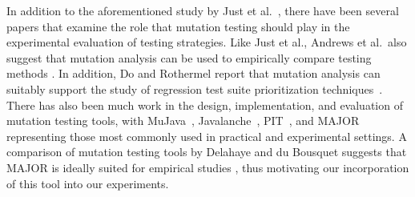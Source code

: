 In addition to the aforementioned study by Just et al.~\cite{just2014}, there have been several papers that examine the role that mutation testing should play in the experimental evaluation of testing strategies. Like Just et al., Andrews et al.\ also suggest that mutation analysis can be used to empirically compare testing methods \cite{andrews2006}. In addition, Do and Rothermel report that mutation analysis can suitably support the study of regression test suite prioritization techniques~\cite{do2006}. There has also been much work in the design, implementation, and evaluation of mutation testing tools, with MuJava~\cite{ma2005}, Javalanche~\cite{schuler2009}, PIT~\cite{pit2014}, and MAJOR~\cite{just2011b} representing those most commonly used in practical and experimental settings. A comparison of mutation testing tools by Delahaye and du Bousquet suggests that MAJOR is ideally suited for empirical studies \cite{comparingautomatedmutationtools:2013}, thus motivating our incorporation of this tool into our experiments.

% 
